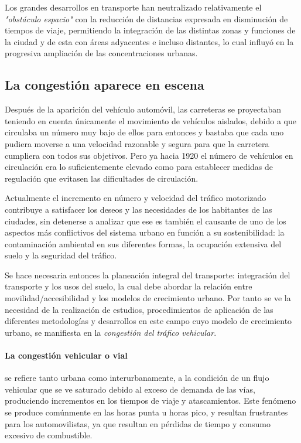 Los grandes desarrollos en transporte han neutralizado relativamente el \textit{"obstáculo espacio"} con la reducción de distancias expresada en disminución de tiempos de viaje, permitiendo la integración de las distintas zonas y funciones de la ciudad y de esta con áreas adyacentes e incluso distantes, lo cual influyó en la progresiva ampliación de las concentraciones urbanas.

\subsection{La congestión aparece en escena}
Después de la aparición del vehículo automóvil, las carreteras se proyectaban teniendo en
cuenta únicamente el movimiento de vehículos aislados, debido a que circulaba un número
muy bajo de ellos para entonces y bastaba que cada uno pudiera moverse a una velocidad
razonable y segura para que la carretera cumpliera con todos sus objetivos. Pero ya hacia
1920 el número de vehículos en circulación era lo suficientemente elevado como para
establecer medidas de regulación que evitasen las dificultades de circulación.

Actualmente el incremento en número y velocidad del tráfico motorizado contribuye a
satisfacer los deseos y las necesidades de los habitantes de las ciudades, sin detenerse a
analizar que ese es también el causante de uno de los aspectos más conflictivos del sistema
urbano en función a su sostenibilidad: la contaminación ambiental en sus diferentes formas,
la ocupación extensiva del suelo y la seguridad del tráfico.

Se hace necesaria entonces la planeación integral del transporte: integración del transporte
y los usos del suelo, la cual debe abordar la relación entre movilidad/accesibilidad y los
modelos de crecimiento urbano. Por tanto se ve la necesidad de la realización de estudios,
procedimientos de aplicación de las diferentes metodologías y desarrollos en este campo
cuyo modelo de crecimiento urbano, se manifiesta en la \emph{congestión del tráfico vehicular}.

\paragraph{La congestión vehicular o vial} se refiere tanto urbana como interurbanamente, a la condición de un flujo vehicular que se ve saturado debido al exceso de demanda de las vías, produciendo incrementos en los tiempos de viaje y atascamientos. Este fenómeno se produce comúnmente en las horas punta u horas pico, y resultan frustrantes para los automovilistas, ya que resultan en pérdidas de tiempo y consumo excesivo de combustible.

